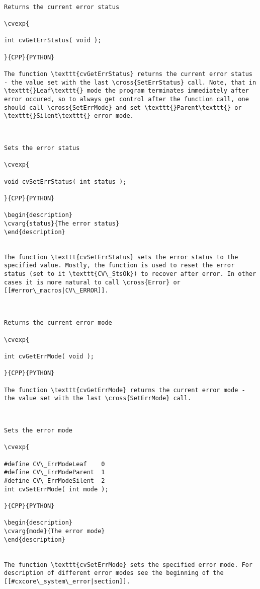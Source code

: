 \label{GetErrStatus}
\begin{verbatim}

Returns the current error status

\cvexp{

int cvGetErrStatus( void );

}{CPP}{PYTHON}

The function \texttt{cvGetErrStatus} returns the current error status - the value set with the last \cross{SetErrStatus} call. Note, that in \texttt{}Leaf\texttt{} mode the program terminates immediately after error occured, so to always get control after the function call, one should call \cross{SetErrMode} and set \texttt{}Parent\texttt{} or \texttt{}Silent\texttt{} error mode.


\end{verbatim}
\label{SetErrStatus}
\begin{verbatim}

Sets the error status

\cvexp{

void cvSetErrStatus( int status );

}{CPP}{PYTHON}

\begin{description}
\cvarg{status}{The error status}
\end{description}


The function \texttt{cvSetErrStatus} sets the error status to the specified value. Mostly, the function is used to reset the error status (set to it \texttt{CV\_StsOk}) to recover after error. In other cases it is more natural to call \cross{Error} or [[#error\_macros|CV\_ERROR]].


\end{verbatim}
\label{GetErrMode}
\begin{verbatim}

Returns the current error mode

\cvexp{

int cvGetErrMode( void );

}{CPP}{PYTHON}

The function \texttt{cvGetErrMode} returns the current error mode - the value set with the last \cross{SetErrMode} call.


\end{verbatim}
\label{SetErrMode}
\begin{verbatim}

Sets the error mode

\cvexp{

#define CV\_ErrModeLeaf    0
#define CV\_ErrModeParent  1
#define CV\_ErrModeSilent  2
int cvSetErrMode( int mode );

}{CPP}{PYTHON}

\begin{description}
\cvarg{mode}{The error mode}
\end{description}


The function \texttt{cvSetErrMode} sets the specified error mode. For description of different error modes see the beginning of the [[#cxcore\_system\_error|section]].


\end{verbatim}
